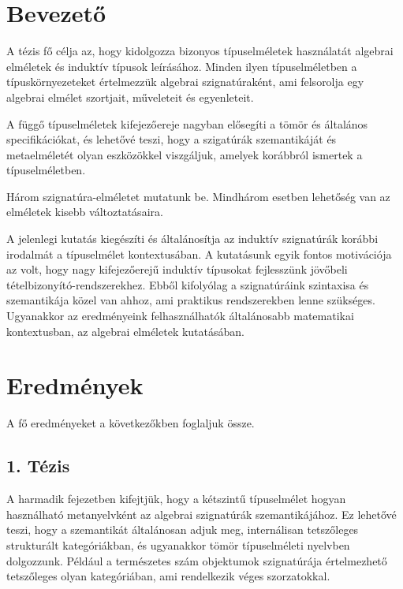 \documentclass[12pt,a4paper,twosided]{article}
\begin{document}
\newpage\null\thispagestyle{empty}\newpage

\section{Bevezető}

A tézis fő célja az, hogy kidolgozza bizonyos típuselméletek használatát
algebrai elméletek és induktív típusok leírásához. Minden ilyen típuselméletben
a típuskörnyezeteket értelmezzük algebrai szignatúraként, ami felsorolja
egy algebrai elmélet szortjait, műveleteit és egyenleteit.

A függő típuselméletek kifejezőereje nagyban elősegíti a tömör és általános
specifikációkat, és lehetővé teszi, hogy a szigatúrák szemantikáját és
metaelméletét olyan eszközökkel viszgáljuk, amelyek korábbról ismertek a
típuselméletben.

Három szignatúra-elméletet mutatunk be. Mindhárom esetben lehetőség van az
elméletek kisebb változtatásaira.

A jelenlegi kutatás kiegészíti és általánosítja az induktív szignatúrák korábbi
irodalmát a típuselmélet kontextusában. A kutatásunk egyik fontos motivációja az
volt, hogy nagy kifejezőerejű induktív típusokat fejlesszünk jövőbeli
tételbizonyító-rendszerekhez. Ebből kifolyólag a szignatúráink szintaxisa és
szemantikája közel van ahhoz, ami praktikus rendszerekben lenne
szükséges. Ugyanakkor az eredményeink felhasználhatók általánosabb matematikai
kontextusban, az algebrai elméletek kutatásában.

\section{Eredmények}

A fő eredményeket a következőkben foglaljuk össze.

\subsection*{1. Tézis}

A harmadik fejezetben kifejtjük, hogy a kétszintű típuselmélet \cite{twolevel}
hogyan használható metanyelvként az algebrai szignatúrák szemantikájához. Ez
lehetővé teszi, hogy a szemantikát általánosan adjuk meg, internálisan tetszőleges
strukturált kategóriákban, és ugyanakkor tömör típuselméleti nyelvben
dolgozzunk. Például a természetes szám objektumok szignatúrája értelmezhető
tetszőleges olyan kategóriában, ami rendelkezik véges szorzatokkal.
\end{document}
